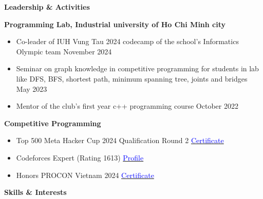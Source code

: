 \documentclass[11pt]{article}
\begin{document}
    \begin{center}
        \hrulefill
    \end{center}
    \begin{center}
        \textbf{Leadership \& Activities}
    \end{center}
    
    \textbf{Programming Lab, Industrial university of Ho Chi Minh city} 
    \begin{itemize}[noitemsep, topsep=0pt, partopsep=0pt, parsep=0pt]
        \item Co-leader of IUH Vung Tau 2024 codecamp of the school's Informatics Olympic team \hfill November 2024 
        \item Seminar on graph knowledge in competitive programming for students in lab like DFS, BFS, shortest path, minimum spanning tree, joints and bridges \hfill May 2023
        \item Mentor of the club's first year c++ programming course \hfill October 2022
    \end{itemize}


    \textbf{Competitive Programming} 
    \begin{itemize}[noitemsep, topsep=0pt, partopsep=0pt, parsep=0pt]
        
        \item Top 500 Meta Hacker Cup 2024 Qualification Round 2 \hfill
        \href{https://www.facebook.com/codingcompetitions/hacker-cup/2024/certificate/484986933064775?source=facebook}{\textcolor{blue}{Certificate}}
    
        \item Codeforces Expert (Rating 1613) \hfill
        \href{https://codeforces.com/profile/taitruong256}{\textcolor{blue}{Profile}}

        \item Honors PROCON Vietnam 2024 
        \hfill \href{https://drive.google.com/file/d/1wuA_vBddyVc0gTyh4YKBaBAhdfkgFYwT/view?usp=sharing}{\textcolor{blue}{Certificate}} 
        
    \end{itemize}
    

    







    \begin{center}
        \hrulefill
    \end{center}
    \begin{center}
        \textbf{Skills \& Interests}
    \end{center}
    
\end{document}
